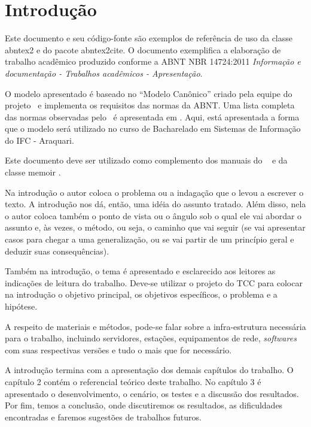 \chapter[Introdução]{Introdução}

Este documento e seu código-fonte são exemplos de referência de uso da classe
\textsf{abntex2} e do pacote \textsf{abntex2cite}. O documento exemplifica a elaboração de trabalho acadêmico produzido conforme a ABNT NBR 14724:2011 \emph{Informação e documentação - Trabalhos acadêmicos - Apresentação}.

O modelo apresentado é baseado no ``Modelo Canônico'' criado pela equipe do projeto \abnTeX\, e implementa os requisitos das normas da ABNT. Uma lista completa das normas
observadas pelo \abnTeX\ é apresentada em . Aqui, está apresentada a forma que o modelo será utilizado no curso de Bacharelado em Sistemas de Informação do IFC - Araquari.

Este documento deve ser utilizado como complemento dos manuais do \abnTeX\ 
\cite{abntex2classe,abntex2cite,abntex2cite-alf} e da classe \textsf{memoir}
\cite{memoir}. 

Na introdução o autor coloca o problema ou a indagação que o levou a escrever o texto. A introdução nos dá, então, uma idéia do assunto tratado. Além disso, nela o autor coloca também o ponto de vista ou o ângulo sob o qual ele vai abordar o assunto e, às vezes, o método, ou seja, o caminho que vai seguir (se vai apresentar casos para chegar a uma generalização, ou se vai partir de um princípio geral e deduzir suas consequências).

Também na introdução, o tema é apresentado e esclarecido aos leitores as indicações de leitura do trabalho. Deve-se utilizar o projeto do TCC para colocar na introdução o objetivo principal, os objetivos específicos, o problema e a hipótese.

A respeito de materiais e métodos, pode-se falar sobre a infra-estrutura necessária para o trabalho, incluindo servidores, estações, equipamentos de rede, \emph{softwares} com suas respectivas versões e tudo o mais que for necessário.

A introdução termina com a apresentação dos demais capítulos do trabalho. O capítulo 2 contém o referencial teórico deste trabalho. No capítulo 3 é apresentado o desenvolvimento, o cenário, os testes e a discussão dos resultados. Por fim, temos a conclusão, onde discutiremos os resultados, as dificuldades encontradas e faremos sugestões de trabalhos futuros.